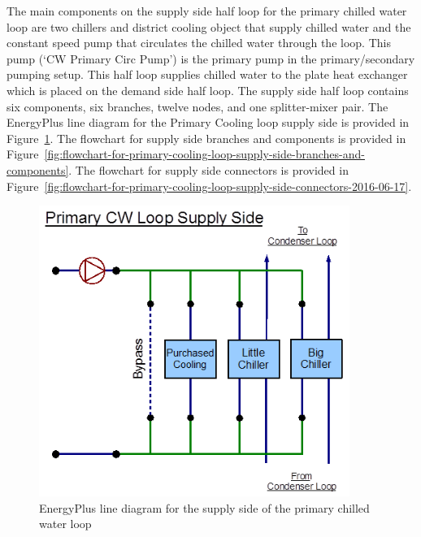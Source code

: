 The main components on the supply side half loop for the primary chilled water loop are two chillers and district cooling object that supply chilled water and the constant speed pump that circulates the chilled water through the loop. This pump (`CW Primary Circ Pump') is the primary pump in the primary/secondary pumping setup. This half loop supplies chilled water to the plate heat exchanger which is placed on the demand side half loop. The supply side half loop contains six components, six branches, twelve nodes, and one splitter-mixer pair. The EnergyPlus line diagram for the Primary Cooling loop supply side is provided in Figure~\ref{fig:energyplus-line-diagram-for-the-supply-side-005}. The flowchart for supply side branches and components is provided in Figure~\ref{fig:flowchart-for-primary-cooling-loop-supply-side-branches-and-components}. The flowchart for supply side connectors is provided in Figure~\ref{fig:flowchart-for-primary-cooling-loop-supply-side-connectors-2016-06-17}.

\begin{figure}[hbtp] %
\centering
\includegraphics[width=0.9\textwidth, height=0.9\textheight, keepaspectratio=true]{media/image093.png}
\caption{EnergyPlus line diagram for the supply side of the primary chilled water loop \protect \label{fig:energyplus-line-diagram-for-the-supply-side-005}}
\end{figure}

